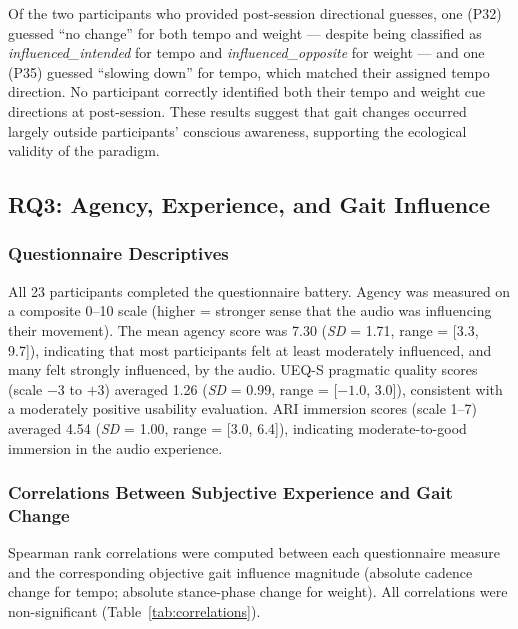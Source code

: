 Of the two participants who provided post-session directional guesses, one
(P32) guessed ``no change'' for both tempo and weight --- despite being
classified as \textit{influenced\_intended} for tempo and
\textit{influenced\_opposite} for weight --- and one (P35) guessed ``slowing
down'' for tempo, which matched their assigned tempo direction. No participant
correctly identified both their tempo and weight cue directions at post-session.
These results suggest that gait changes occurred largely outside participants'
conscious awareness, supporting the ecological validity of the paradigm.

\subsection{RQ3: Agency, Experience, and Gait Influence}
\label{sec:results:agency}

\subsubsection{Questionnaire Descriptives}

All 23 participants completed the questionnaire battery. Agency was measured
on a composite 0--10 scale (higher = stronger sense that the audio was
influencing their movement). The mean agency score was 7.30
(\textit{SD} = 1.71, range = [3.3, 9.7]), indicating that most participants
felt at least moderately influenced, and many felt strongly influenced, by the
audio. UEQ-S pragmatic quality scores (scale $-3$ to $+3$) averaged 1.26
(\textit{SD} = 0.99, range = [$-1.0$, 3.0]), consistent with a moderately
positive usability evaluation. ARI immersion scores (scale 1--7) averaged 4.54
(\textit{SD} = 1.00, range = [3.0, 6.4]), indicating moderate-to-good
immersion in the audio experience.

\subsubsection{Correlations Between Subjective Experience and Gait Change}

Spearman rank correlations were computed between each questionnaire measure and
the corresponding objective gait influence magnitude (absolute cadence change
for tempo; absolute stance-phase change for weight). All correlations were
non-significant (Table~\ref{tab:correlations}).

